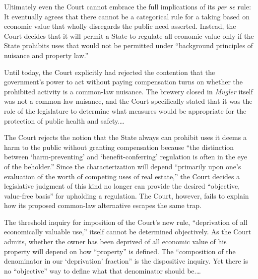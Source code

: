 Ultimately even the Court cannot embrace the full implications of its
\textit{per se} rule: It eventually agrees that there cannot be a categorical
rule for a taking based on economic value that wholly disregards the public need
asserted. Instead, the Court decides that it will permit a State to regulate all
economic value only if the State prohibits uses that would not be permitted
under ``background principles of nuisance and property
law.''

Until today, the Court explicitly had rejected the contention that the
government's power to act without paying compensation turns on whether the
prohibited activity is a common-law nuisance. The brewery closed in
\textit{Mugler} itself was not a common-law nuisance, and the Court specifically
stated that it was the role of the legislature to determine what measures would
be appropriate for the protection of public health and safety.\ldots

The Court rejects the notion that the State always can prohibit uses it deems a
harm to the public without granting compensation because ``the distinction
between `harm-preventing' and `benefit-conferring' regulation is often in the
eye of the beholder.'' Since the characterization will depend ``primarily upon
one's evaluation of the worth of competing uses of real estate,'' the Court
decides a legislative judgment of this kind no longer can provide the desired
``objective, value-free basis'' for upholding a regulation. The Court, however,
fails to explain how its proposed common-law alternative escapes the same trap. 

The threshold inquiry for imposition of the Court's new rule, ``deprivation of
all economically valuable use,'' itself cannot be determined objectively. As the
Court admits, whether the owner has been deprived of all economic value of his
property will depend on how ``property'' is defined. The ``composition of the
denominator in our `deprivation' fraction'' is the dispositive inquiry. Yet
there is no ``objective'' way to define what that denominator should be.\ldots

